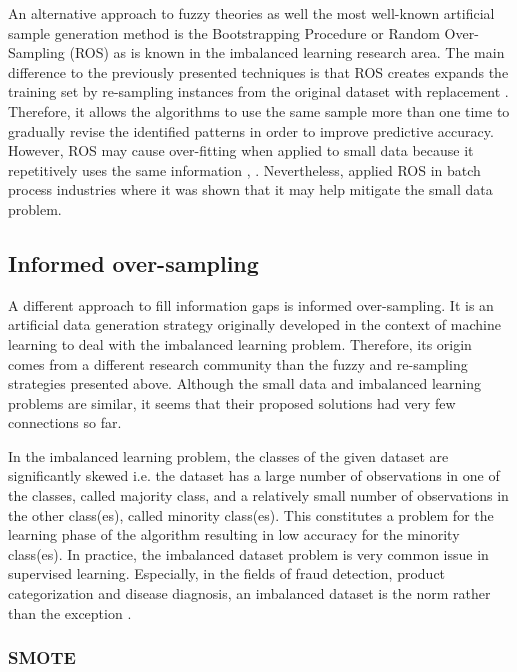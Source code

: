 \documentclass[parskip=full]{scrartcl}
\begin{document}
An alternative approach to fuzzy theories as well the most well-known artificial
sample generation method is the Bootstrapping Procedure \cite{AbdulLateh.2017}
or Random Over-Sampling (ROS) as is known in the imbalanced learning research
area. The main difference to the previously presented techniques is that ROS
creates expands the training set by re-sampling instances from the original
dataset with replacement \cite{Efron.1993}. Therefore, it allows the algorithms
to use the same sample more than one time to gradually revise the identified
patterns in order to improve predictive accuracy. However, ROS may cause
over-fitting when applied to small data because it repetitively uses the same
information \cite{Tsai.2015}, \cite{Li.2018}. Nevertheless, \cite{Ivanescu.2006}
applied ROS in batch process industries where it was shown that it may help
mitigate the small data problem.

\subsection{Informed over-sampling}

A different approach to fill information gaps is informed over-sampling. It is
an artificial data generation strategy originally developed in the context of
machine learning to deal with the imbalanced learning problem. Therefore, its
origin comes from a different research community than the fuzzy and re-sampling
strategies presented above. Although the small data and imbalanced learning
problems are similar, it seems that their proposed solutions had very few
connections so far.

In the imbalanced learning problem, the classes of the given dataset are
significantly skewed i.e. the dataset has a large number of observations in one
of the classes, called majority class, and a relatively small number of
observations in the other class(es), called minority class(es). This constitutes
a problem for the learning phase of the algorithm resulting in low accuracy for
the minority class(es). In practice, the imbalanced dataset problem is very
common issue in supervised learning. Especially, in the fields of fraud
detection, product categorization and disease diagnosis, an imbalanced dataset
is the norm rather than the exception \cite{He.2013}.

\subsubsection{SMOTE}
\end{document}
